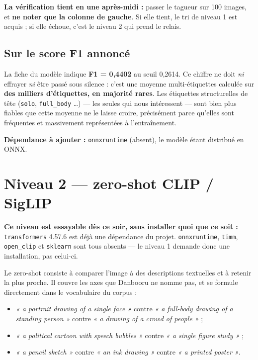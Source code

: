 \documentclass[11pt,a4paper]{article}
\newcommand{\aretenir}[1]{%
  \par\medskip
  \noindent\colorbox{encadre}{%
    \begin{minipage}{\dimexpr\linewidth-2\fboxsep}
      \vspace{2pt}#1\vspace{2pt}
    \end{minipage}}%
  \par\medskip
}
\newcommand{\alerte}[1]{\textcolor{alerte}{\textbf{#1}}}
\begin{document}
\aretenir{\textbf{La vérification tient en une après-midi :} passer le tagueur sur
100 images, et \textbf{ne noter que la colonne de gauche}. Si elle tient, le tri
de niveau 1 est acquis ; si elle échoue, c'est le niveau 2 qui prend le relais.}

\subsection{Sur le score F1 annoncé}

La fiche du modèle indique \textbf{F1 = 0,4402} au seuil 0,2614. Ce chiffre ne
doit \emph{ni} effrayer \emph{ni} être passé sous silence : c'est une moyenne
multi-étiquettes calculée sur \textbf{des milliers d'étiquettes, en majorité
rares}. Les étiquettes structurelles de tête (\texttt{solo}, \texttt{full\_body}
\dots) — les seules qui nous intéressent — sont bien plus fiables que cette
moyenne ne le laisse croire, précisément parce qu'elles sont fréquentes et
massivement représentées à l'entraînement.

\alerte{Dépendance à ajouter :} \texttt{onnxruntime} (absent), le modèle étant
distribué en ONNX.

\section{Niveau 2 — zero-shot CLIP / SigLIP}

\aretenir{\textbf{Ce niveau est essayable dès ce soir, sans installer quoi que ce
soit :} \texttt{transformers} 4.57.6 est déjà une dépendance du projet.
\texttt{onnxruntime}, \texttt{timm}, \texttt{open\_clip} et \texttt{sklearn} sont
tous absents — le niveau 1 demande donc une installation, pas celui-ci.}

Le zero-shot consiste à comparer l'image à des descriptions textuelles et à
retenir la plus proche. Il couvre les axes que Danbooru ne nomme pas, et se
formule directement dans le vocabulaire du corpus :

\begin{itemize}[leftmargin=*,itemsep=3pt]
  \item \emph{« a portrait drawing of a single face »} contre
        \emph{« a full-body drawing of a standing person »} contre
        \emph{« a drawing of a crowd of people »} ;
  \item \emph{« a political cartoon with speech bubbles »} contre
        \emph{« a single figure study »} ;
  \item \emph{« a pencil sketch »} contre \emph{« an ink drawing »} contre
        \emph{« a printed poster »}.
\end{itemize}
\end{document}
